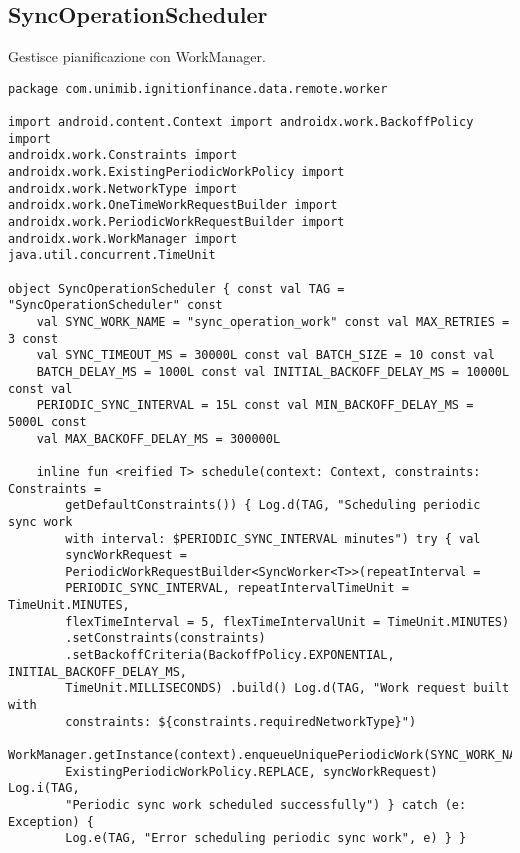 \subsection{SyncOperationScheduler}\label{subsec:syncoperationscheduler}
Gestisce pianificazione con WorkManager.

\begin{lstlisting}[caption=SyncOperationScheduler.kt, label=lst:syncoperationscheduler, basicstyle=\ttfamily\scriptsize, breaklines=true, breakatwhitespace=true, tabsize=4]
package com.unimib.ignitionfinance.data.remote.worker

import android.content.Context import androidx.work.BackoffPolicy import
androidx.work.Constraints import androidx.work.ExistingPeriodicWorkPolicy import
androidx.work.NetworkType import androidx.work.OneTimeWorkRequestBuilder import
androidx.work.PeriodicWorkRequestBuilder import androidx.work.WorkManager import
java.util.concurrent.TimeUnit

object SyncOperationScheduler { const val TAG = "SyncOperationScheduler" const
    val SYNC_WORK_NAME = "sync_operation_work" const val MAX_RETRIES = 3 const
    val SYNC_TIMEOUT_MS = 30000L const val BATCH_SIZE = 10 const val
    BATCH_DELAY_MS = 1000L const val INITIAL_BACKOFF_DELAY_MS = 10000L const val
    PERIODIC_SYNC_INTERVAL = 15L const val MIN_BACKOFF_DELAY_MS = 5000L const
    val MAX_BACKOFF_DELAY_MS = 300000L

    inline fun <reified T> schedule(context: Context, constraints: Constraints =
        getDefaultConstraints()) { Log.d(TAG, "Scheduling periodic sync work
        with interval: $PERIODIC_SYNC_INTERVAL minutes") try { val
        syncWorkRequest =
        PeriodicWorkRequestBuilder<SyncWorker<T>>(repeatInterval =
        PERIODIC_SYNC_INTERVAL, repeatIntervalTimeUnit = TimeUnit.MINUTES,
        flexTimeInterval = 5, flexTimeIntervalUnit = TimeUnit.MINUTES)
        .setConstraints(constraints)
        .setBackoffCriteria(BackoffPolicy.EXPONENTIAL, INITIAL_BACKOFF_DELAY_MS,
        TimeUnit.MILLISECONDS) .build() Log.d(TAG, "Work request built with
        constraints: ${constraints.requiredNetworkType}")
        WorkManager.getInstance(context).enqueueUniquePeriodicWork(SYNC_WORK_NAME,
        ExistingPeriodicWorkPolicy.REPLACE, syncWorkRequest) Log.i(TAG,
        "Periodic sync work scheduled successfully") } catch (e: Exception) {
        Log.e(TAG, "Error scheduling periodic sync work", e) } }


\end{lstlisting}
